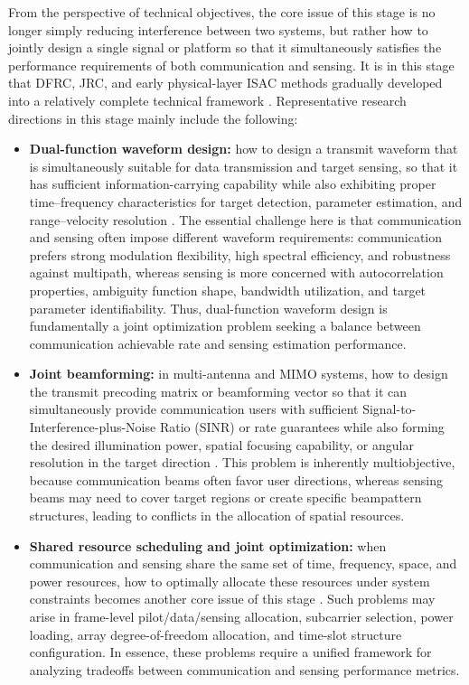 From the perspective of technical objectives, the core issue of this stage is no longer simply reducing interference between two systems, but rather how to jointly design a single signal or platform so that it simultaneously satisfies the performance requirements of both communication and sensing. It is in this stage that DFRC, JRC, and early physical-layer ISAC methods gradually developed into a relatively complete technical framework \cite{Liu2020JointRadarComm,Zhang2021ISAC6G,Hassanien2015dual}. Representative research directions in this stage mainly include the following:
\begin{itemize}
    \item \textbf{Dual-function waveform design:} how to design a transmit waveform that is simultaneously suitable for data transmission and target sensing, so that it has sufficient information-carrying capability while also exhibiting proper time--frequency characteristics for target detection, parameter estimation, and range--velocity resolution \cite{Liu2020JointRadarComm,Hassanien2015dual}. The essential challenge here is that communication and sensing often impose different waveform requirements: communication prefers strong modulation flexibility, high spectral efficiency, and robustness against multipath, whereas sensing is more concerned with autocorrelation properties, ambiguity function shape, bandwidth utilization, and target parameter identifiability. Thus, dual-function waveform design is fundamentally a joint optimization problem seeking a balance between communication achievable rate and sensing estimation performance.
    
    \item \textbf{Joint beamforming:} in multi-antenna and MIMO systems, how to design the transmit precoding matrix or beamforming vector so that it can simultaneously provide communication users with sufficient Signal-to-Interference-plus-Noise Ratio (SINR) or rate guarantees while also forming the desired illumination power, spatial focusing capability, or angular resolution in the target direction \cite{Liu2020JointRadarComm,Liu2022ISAC}. This problem is inherently multiobjective, because communication beams often favor user directions, whereas sensing beams may need to cover target regions or create specific beampattern structures, leading to conflicts in the allocation of spatial resources.
    
    \item \textbf{Shared resource scheduling and joint optimization:} when communication and sensing share the same set of time, frequency, space, and power resources, how to optimally allocate these resources under system constraints becomes another core issue of this stage \cite{Zhang2021ISAC6G,Liu2022ISAC}. Such problems may arise in frame-level pilot/data/sensing allocation, subcarrier selection, power loading, array degree-of-freedom allocation, and time-slot structure configuration. In essence, these problems require a unified framework for analyzing tradeoffs between communication and sensing performance metrics.
\end{itemize}

